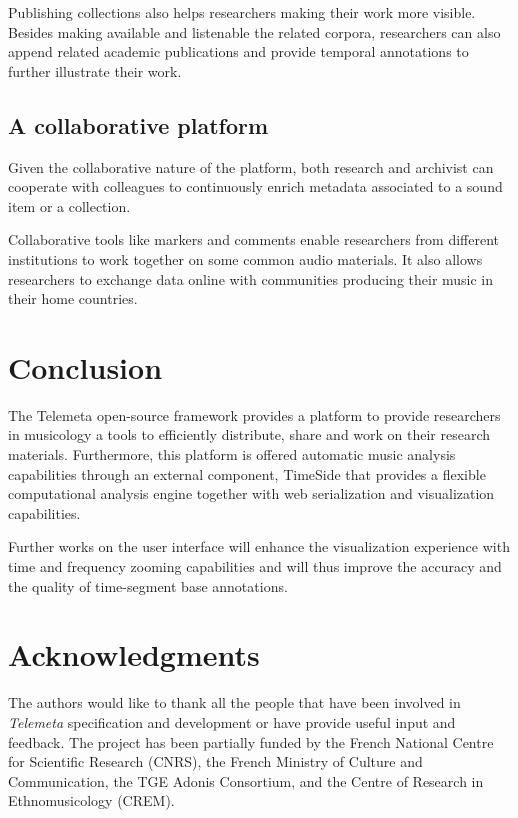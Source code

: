 \documentclass{paper}
\begin{document}
Publishing collections also helps researchers making their work more visible. Besides making available and listenable the related corpora, researchers can also append related academic publications and provide temporal annotations to further illustrate their work.


\subsection{A collaborative platform}
Given the collaborative nature of the platform, both research and archivist can cooperate with colleagues to continuously enrich metadata associated to a sound item or a collection.  

Collaborative tools like markers and comments enable researchers from different institutions to work together on some common audio materials.
It also allows researchers to exchange data online with communities producing their music in their home countries.





\section{Conclusion}

The Telemeta open-source framework provides a platform to provide researchers in musicology a tools to efficiently distribute, share and work on their research materials. Furthermore, this platform is offered automatic music analysis capabilities through an external component, TimeSide that provides a flexible computational analysis engine together with web serialization and visualization capabilities.

Further works on the user interface will enhance the visualization experience with time and frequency zooming capabilities and will thus improve the accuracy and the quality of time-segment base annotations.



\section*{Acknowledgments} 
{\small The authors would like to thank all the people that have been involved in \emph{Telemeta} specification and development or have provide useful input and feedback. 
The project has been partially funded by the French National Centre for Scientific Research (CNRS), the French Ministry of Culture and Communication, the TGE Adonis Consortium, and the Centre of Research in Ethnomusicology (CREM).}


%

\end{document}
